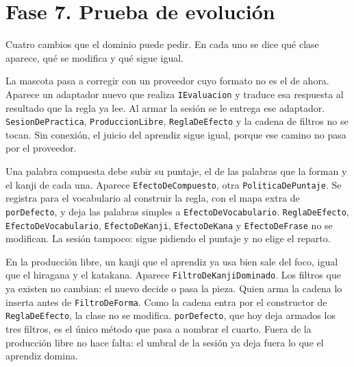 \documentclass[11pt]{article}
\begin{document}
\section{Fase 7. Prueba de evolución}

Cuatro cambios que el dominio puede pedir. En cada uno se dice qué clase aparece, qué se modifica y qué sigue igual.

\begin{description}
  \raggedright
  \item[Otro proveedor de IA.] La mascota pasa a corregir con un proveedor cuyo formato no es el de ahora. Aparece un adaptador nuevo que realiza \texttt{IEvaluacion} y traduce esa respuesta al resultado que la regla ya lee. Al armar la sesión se le entrega ese adaptador. \texttt{SesionDePractica}, \texttt{ProduccionLibre}, \texttt{ReglaDeEfecto} y la cadena de filtros no se tocan. Sin conexión, el juicio del aprendiz sigue igual, porque ese camino no pasa por el proveedor.
  \item[Un compuesto.] Una palabra compuesta debe subir su puntaje, el de las palabras que la forman y el kanji de cada una. Aparece \texttt{EfectoDeCompuesto}, otra \texttt{PoliticaDePuntaje}. Se registra para el vocabulario al construir la regla, con el mapa extra de \texttt{porDefecto}, y deja las palabras simples a \texttt{EfectoDeVocabulario}. \texttt{ReglaDeEfecto}, \texttt{EfectoDeVocabulario}, \texttt{EfectoDeKanji}, \texttt{EfectoDeKana} y \texttt{EfectoDeFrase} no se modifican. La sesión tampoco: sigue pidiendo el puntaje y no elige el reparto.
  \item[El kanji ya dominado.] En la producción libre, un kanji que el aprendiz ya usa bien sale del foco, igual que el hiragana y el katakana. Aparece \texttt{FiltroDeKanjiDominado}. Los filtros que ya existen no cambian: el nuevo decide o pasa la pieza. Quien arma la cadena lo inserta antes de \texttt{FiltroDeForma}. Como la cadena entra por el constructor de \texttt{ReglaDeEfecto}, la clase no se modifica. \texttt{porDefecto}, que hoy deja armados los tres filtros, es el único método que pasa a nombrar el cuarto. Fuera de la producción libre no hace falta: el umbral de la sesión ya deja fuera lo que el aprendiz domina.

\end{description}
\end{document}
